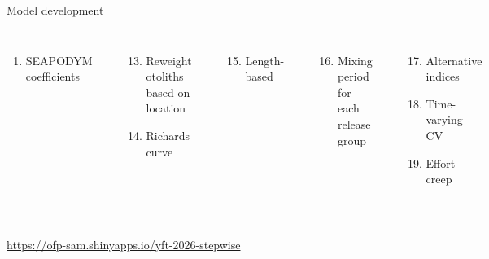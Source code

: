 \documentclass[aspectratio=169]{beamer}
\begin{document}
\begin{frame}{Model development}
\begin{columns}[T]
\begin{enumerate}
      \item SEAPODYM coefficients\\[1.2ex]
    \end{enumerate}
    \\[-0.8ex]
    \begin{enumerate}\setcounter{enumi}{12}\setlength\itemsep{-0.3ex}
      \item Reweight otoliths based on location
      \item Richards curve\\[1.2ex]
    \end{enumerate}
    \\[-0.8ex]
    \begin{enumerate}\setcounter{enumi}{14}\setlength\itemsep{-0.3ex}
      \item Length-based\\[1.2ex]
    \end{enumerate}
    \\[-0.8ex]
    \begin{enumerate}\setcounter{enumi}{15}\setlength\itemsep{-0.3ex}
      \item Mixing period for each release group\\[1.2ex]
    \end{enumerate}
    \\[-0.8ex]
    \begin{enumerate}\setcounter{enumi}{16}\setlength\itemsep{-0.3ex}
      \item Alternative indices
      \item Time-varying CV
      \item Effort creep
    \end{enumerate}
  \end{columns}
\end{frame}


\begin{frame}
  \vspace{6ex}
  \centering
  \\[4ex]
  \blue\url{https://ofp-sam.shinyapps.io/yft-2026-stepwise}
\end{frame}


\end{document}

